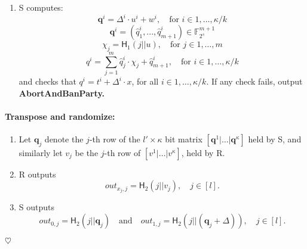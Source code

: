 \documentclass{article}
\begin{document}
\begin{enumerate}
    \item S computes: 
        \begin{displaymath}
            \mathbf{q}^i = \Delta^i \cdot u^i + w^i, \quad \textrm{for} \,\, i \in 1, \dots, \kappa / k
        \end{displaymath}
        \begin{displaymath}
            \mathbf{q}^i = (\hat{q}^i_1, ..., \hat{q}^i_{m+1}) \in \mathbb{F}_{2^s}^{m+1}
        \end{displaymath}
        \begin{displaymath}
            \chi_j = \mathsf{H}_1(j || u), \quad \textrm{for} \,\, j \in 1, \dots, m 
        \end{displaymath}
        \begin{displaymath}
            q^i = \sum_{j=1}^m \hat{q}^i_j \cdot \chi_j + \hat{q}^i_{m+1}, \quad \textrm{for} \,\, i \in 1, \dots, \kappa / k
        \end{displaymath}
        and checks that $q^i = t^i + \Delta^i \cdot x$, for all $i \in 1, \dots, \kappa / k$. If any check fails, output \bf{AbortAndBanParty}.
    
  \end{enumerate}


\paragraph{Transpose and randomize:}
    \begin{enumerate}
        \item Let $\mathbf{q}_j$ denote the $j$-th row of the $l' \times \kappa$ bit matrix $[\mathbf{q}^1| \dots |\mathbf{q}^{\kappa}]$ held by S, and similarly let $v_j$ be the $j$-th row of $[v^1| \dots |v^{\kappa}]$, held by R.

        \item R outputs
            \begin{displaymath}
                out_{x_j,j} = \mathsf{H}_2(j || v_j), \quad j \in [l].
            \end{displaymath}

        \item S outputs 
            \begin{displaymath}
                out_{0,j} = \mathsf{H}_2(j || \mathbf{q}_j) \quad \textrm{and} \quad out_{1,j} = \mathsf{H}_2(j || (\mathbf{q}_j + \Delta)), \quad j \in [l].
            \end{displaymath}
    \end{enumerate}

$\heartsuit$

 

\end{document}
